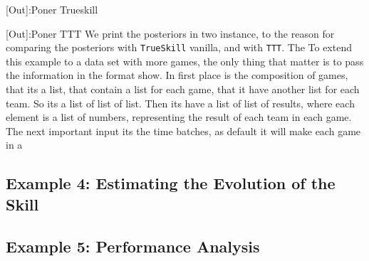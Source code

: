 \documentclass[article]{jss}
\begin{document}

\vspace{-0.3cm}
[Out]:Poner Trueskill

[Out]:Poner TTT
\vspace{0.3cm}
We print the posteriors in two instance, to the reason for comparing the posteriors with \texttt{TrueSkill} vanilla, and with \texttt{TTT}.
The 
To extend this example to a data set with more games, the only thing that matter is to pass the information in the format show. 
In first place is the composition of games, that its a list, that contain a list for each game, that it have another list for each team. 
So its a list of list of list. 
Then its have a list of list of results, where each element is a list of numbers, representing the result of each team in each game. 
The next important input its the time batches, as default it will make each game in a 


\subsection{Example 4: Estimating the Evolution of the Skill}










\subsection{Example 5: Performance Analysis}




















\end{document}
